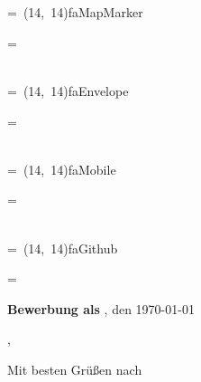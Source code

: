 \documentclass[10pt,A4]{article}
\newcommand*{\vcenteredhbox}[1]{\begingroup
\setbox0=\hbox{#1}\parbox{\wd0}{\box0}\endgroup}
\newcommand{\icon}[2]{
	\makebox(#2, #2){\textcolor{textcolor}{\csname fa#1\endcsname}}}	%
\newcommand{\icontext}[3]{ 						%
	\vcenteredhbox{\icon{#1}{#2}} \vcenteredhbox{\textcolor{textcolor}{#3}}
}
\newcommand*{\contactpage}[1]{
	\begin{minipage}{0.25\textwidth}
		\icontext{MapMarker}{#1}{\Location}\\
		\icontext{Envelope}{#1}{\Mail}\\
		\icontext{Mobile}{#1}{\Phone}\\
		\icontext{Github}{#1}{\Link}
	\end{minipage}
}
\newcounter{a}
\newcounter{b}
\newcounter{c}
\begin{document}
\begin{minipage}[c][2.25cm][c]{0.55\textwidth}
	\vspace{0pt}
	\Huge
	\textcolor{textcolor}{\textbf{\Name}}

	\Large
	\textcolor{color1}{~\Role}
	\vspace{\fill}

	\footnotesize
	\textcolor{color2}{~~~}
\end{minipage}
\hfill
\contactpage{14}
\hspace*{-0.5cm}
\vfill
\begin{minipage}[b]{1\textwidth}

\large
	\textcolor{textcolor}{\textbf{\CompanyName}}

	\textcolor{textcolor}{\Address}

	\textcolor{textcolor}{\City}
	\newline
	\newline
	\newline
	\newline

	\textcolor{textcolor}{\Large{\textbf{Bewerbung als \NewRole}}}
	\hspace*{\fill}
	\textcolor{textcolor}{\Location, den \today}

\end{minipage}
\vfill
\begin{minipage}[t][19cm][t]{0.95\textwidth}
\begin{flushleft}
\textcolor{textcolor}{\Recruiter,}
\newline
\newline

\textcolor{textcolor}{\Letter
\newline
\newline
\newline
\newline
Mit besten Grüßen nach \City
\newline
\newline
\newline
\Name
\newline
\newline
\newline
\newline
\textcolor{textcolor}{\Postskriptum}
}
\end{flushleft}
\end{minipage}
\end{document}
